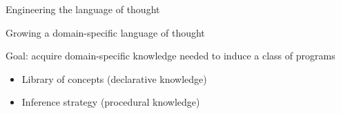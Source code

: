 \documentclass{beamer}
\begin{document}
\begin{frame}{Engineering the language of thought}
\end{frame}





\begin{frame}{Growing a domain-specific language of thought}
  
  Goal: acquire domain-specific knowledge needed to induce a class of programs


  
  \pause
  \vspace{1cm}

  \begin{itemize}
  \item Library of concepts (declarative knowledge)
    \item Inference strategy (procedural knowledge)
    \end{itemize}
\end{frame}
\end{document}
